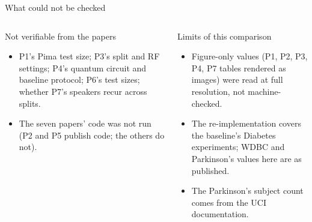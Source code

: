\documentclass[aspectratio=169,10pt,t,xcolor={table}]{beamer}
\begin{document}
\begin{frame}{What could not be checked}
\begin{columns}[T]
\begin{block}{Not verifiable from the papers}
\footnotesize
\begin{itemize}
  \item P1's Pima test size; P3's split and RF settings; P4's quantum circuit and baseline protocol; P6's test sizes; whether P7's speakers recur across splits.
  \item The seven papers' code was not run (P2 and P5 publish code; the others do not).
\end{itemize}
\end{block}
\begin{block}{Limits of this comparison}
\footnotesize
\begin{itemize}
  \item Figure-only values (P1, P2, P3, P4, P7 tables rendered as images) were read at full resolution, not machine-checked.
  \item The re-implementation covers the baseline's Diabetes experiments; WDBC and Parkinson's values here are as published.
  \item The Parkinson's subject count comes from the UCI documentation.
\end{itemize}
\end{block}
\end{columns}
\end{frame}
\end{document}
